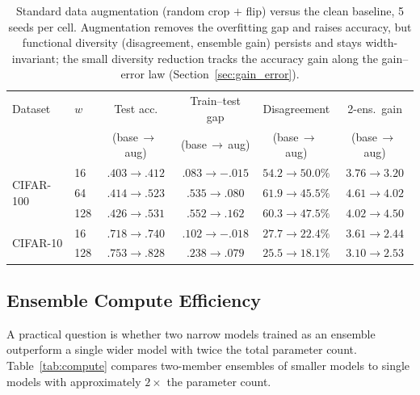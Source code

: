 \documentclass[11pt]{article}
\begin{document}
\begin{table}[h]
\centering
\small
\setlength{\tabcolsep}{5pt}
\begin{tabular}{llcccc}
\toprule
Dataset & $w$ & Test acc. & Train--test gap & Disagreement & 2-ens.\ gain\\
        &     & (base\,$\to$\,aug) & (base\,$\to$\,aug) & (base\,$\to$\,aug) & (base\,$\to$\,aug)\\
\midrule
\multirow{3}{*}{CIFAR-100}
 & 16  & $.403\to.412$ & $.083\to{-.015}$ & $54.2\to50.0\%$ & $3.76\to3.20$\\
 & 64  & $.414\to.523$ & $.535\to.080$ & $61.9\to45.5\%$ & $4.61\to4.02$\\
 & 128 & $.426\to.531$ & $.552\to.162$ & $60.3\to47.5\%$ & $4.02\to4.50$\\
\midrule
\multirow{2}{*}{CIFAR-10}
 & 16  & $.718\to.740$ & $.102\to{-.018}$ & $27.7\to22.4\%$ & $3.61\to2.44$\\
 & 128 & $.753\to.828$ & $.238\to.079$ & $25.5\to18.1\%$ & $3.10\to2.53$\\
\bottomrule
\end{tabular}
\caption{Standard data augmentation (random crop $+$ flip) versus the clean
baseline, 5 seeds per cell.  Augmentation removes the overfitting gap and
raises accuracy, but functional diversity (disagreement, ensemble gain)
persists and stays width-invariant; the small diversity reduction tracks the
accuracy gain along the gain--error law (Section~\ref{sec:gain_error}).}
\label{tab:augmentation}
\end{table}

\subsection{Ensemble Compute Efficiency}
\label{sec:compute}

A practical question is whether two narrow models trained as an ensemble
outperform a single wider model with twice the total parameter count.
Table~\ref{tab:compute} compares two-member ensembles of smaller models
to single models with approximately $2\times$ the parameter count.
\end{document}
